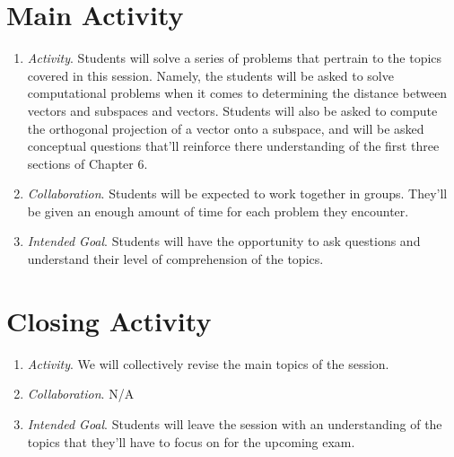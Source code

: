 \documentclass[11pt]{article}
\begin{document}
\section{\centering Main Activity}
	\begin{enumerate}
		\item \textit{Activity}. Students will solve a series of problems that pertrain to the topics covered in this session. Namely, the students will be asked
						to solve computational problems when it comes to determining the distance between vectors and subspaces and vectors.
						Students will also be asked to compute the orthogonal projection of a vector onto a subspace, and will be asked conceptual
						questions that'll reinforce there understanding of the first three sections of Chapter 6.
		\item \textit{Collaboration}. Students will be expected to work together in groups. They'll be given an enough amount of time for each problem they
							encounter.
		\item \textit{Intended Goal}. Students will have the opportunity to ask questions and understand their level of comprehension of the topics.
	\end{enumerate}

\section{\centering Closing Activity}
	\begin{enumerate}
		\item \textit{Activity}. We will collectively revise the main topics of the session.
		\item \textit{Collaboration}. \textsc{N/A}
		\item \textit{Intended Goal}. Students will leave the session with an understanding of the topics that they'll have to focus on for the upcoming exam.
	\end{enumerate}
\end{document}
